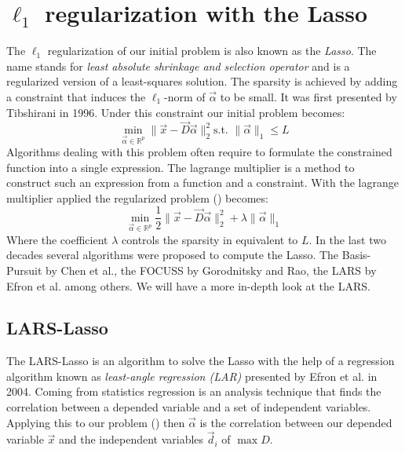 \section { $\ell_1$ regularization with the Lasso}
The $\ell_1$ regularization of our initial problem is also known as the
\emph{Lasso}. The name stands for \emph{least absolute shrinkage and
selection operator} and is a regularized version of a least-squares
solution. The sparsity is achieved by adding a constraint that induces
the $\ell_1$-norm of $\vec{\alpha}$ to be small. It was first
presented by Tibshirani
in 1996\cite{Tibshirani1996}. Under this constraint our initial problem becomes:
\begin{equation}
\min_{\vec{\alpha}\in\mathbb{R}^{p}} \lVert \vec{x} - \vec{D}\vec{\alpha}
\rVert^{2}_{2} \textrm{
s.t. } \lVert \vec{\alpha} \rVert_{1} \leq L \label{eq:l1}
\end{equation}
Algorithms dealing with this problem often require to formulate the
constrained function into a single expression. The lagrange multiplier is a
method to construct such an expression from a function and a constraint. With
the lagrange multiplier applied the regularized problem ()
becomes:
\begin{equation}
\min_{\vec{\alpha}\in\mathbb{R}^{p}}  \frac{1}{2} \lVert \vec{x} -
\vec{D}\vec{\alpha} \rVert^{2}_{2} +
\lambda \lVert \vec{\alpha} \rVert_{1}\label{eq:l1lagrange}
\end{equation}
Where the coefficient $\lambda$ controls the sparsity in equivalent to $L$.
In the last two decades several algorithms were proposed to compute the
Lasso. The Basis-Pursuit by Chen et al.\cite{Chen1995}, the
FOCUSS by Gorodnitsky and Rao\cite{FOCUSS}, the LARS by Efron et
al.\cite{Efron2004} among others. We will have a more in-depth look at the LARS.



\subsection{LARS-Lasso}
\label{sec:lars}
The LARS-Lasso is an algorithm to solve the Lasso with the help of a regression
algorithm known as \emph{least-angle regression (LAR)} presented by
Efron et al.\cite{Efron2004} in 2004. 
Coming from statistics regression is an analysis technique that
finds the correlation between a depended variable and a set of
independent variables. Applying this to our problem ()
then $\vec{\alpha}$ is the correlation between our depended variable $\vec{x}$
and the independent variables $\vec{d}_i$ of $\max{D}$. 


